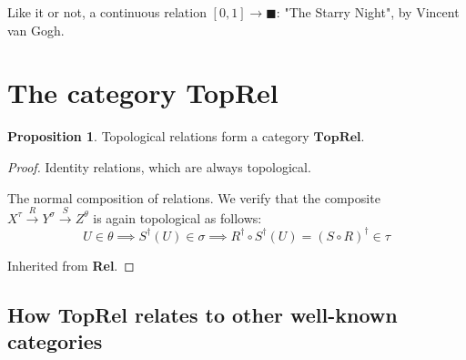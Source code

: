 \documentclass{tufte-handout}
\theoremstyle{definition}
\newtheorem{proposition}[theorem]{Proposition}
\begin{document}
\begin{marginfigure}
\centering
{}
\caption{Like it or not, a continuous relation $[0,1] \rightarrow \blacksquare$: "The Starry Night", by Vincent van Gogh.}
\end{marginfigure}

\section{The category \textbf{TopRel}}

\begin{proposition}
Topological relations form a category $\mathbf{TopRel}$.
\begin{proof}
 Identity relations, which are always topological.

 The normal composition of relations. We verify that the composite $X^\tau \overset{R}{\rightarrow} Y^\sigma \overset{S}{\rightarrow} Z^\theta$ is again topological as follows:
\[U \in \theta \implies S^\dag(U) \in \sigma \implies R^\dag \circ S^\dag(U) = (S \circ R)^\dag \in \tau\]

 Inherited from \textbf{Rel}.
\end{proof}
\end{proposition}

\subsection{How \textbf{TopRel} relates to other well-known categories}
\end{document}
